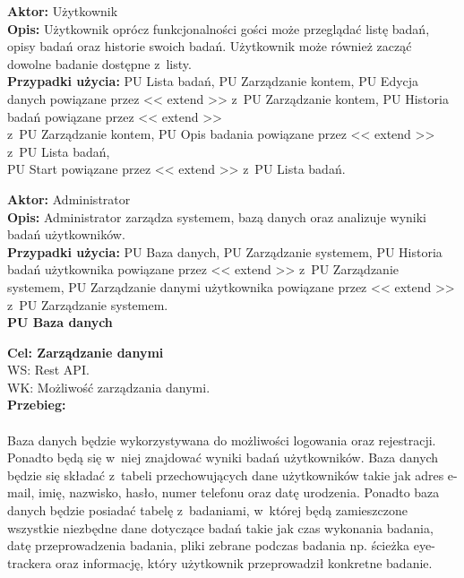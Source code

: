 \documentclass[12pt, letterpaper]{article}
\begin{document}
		\textbf{Aktor:} Użytkownik\\
		
		\textbf{Opis:} Użytkownik oprócz funkcjonalności gości może przeglądać listę badań, opisy badań oraz historie swoich badań. Użytkownik może również zacząć dowolne badanie dostępne z~listy.\\
		
		\textbf{Przypadki użycia:} PU Lista badań, PU Zarządzanie kontem, PU Edycja danych powiązane przez << extend >> z~PU Zarządzanie kontem, PU Historia badań powiązane przez << extend >>\\ z~PU Zarządzanie kontem, PU Opis badania powiązane przez << extend >> z~PU Lista badań,\\ PU Start powiązane przez << extend >> z~PU Lista badań. 
		
		\vspace{1cm}
		
		\textbf{Aktor:} Administrator\\
		
		\textbf{Opis:} Administrator zarządza systemem, bazą danych oraz analizuje wyniki badań użytkowników.\\
		
		\textbf{Przypadki użycia:} PU Baza danych, PU Zarządzanie systemem, PU Historia badań użytkownika powiązane przez << extend >> z~PU Zarządzanie systemem, PU Zarządzanie danymi użytkownika powiązane przez << extend >> z~PU Zarządzanie systemem.\\
		
		
		\textbf{PU Baza danych}
		
		\quad
		
		\textbf{Cel: Zarządzanie danymi}\\
		
		WS: Rest API.\\
		
		WK: Możliwość zarządzania danymi.\\
		
		\textbf{Przebieg: }
\paragraph{}Baza danych będzie wykorzystywana do możliwości logowania oraz rejestracji. Ponadto będą się w~niej znajdować wyniki badań użytkowników. Baza danych będzie się składać z~tabeli przechowujących dane użytkowników takie jak adres e-mail, imię, nazwisko, hasło, numer telefonu oraz datę urodzenia. Ponadto baza danych będzie posiadać tabelę z~badaniami, w~której będą zamieszczone wszystkie niezbędne dane dotyczące badań takie jak czas wykonania badania, datę przeprowadzenia badania, pliki zebrane podczas badania np. ścieżka eye-trackera oraz informację, który użytkownik przeprowadził konkretne badanie.\\
		
\end{document}
